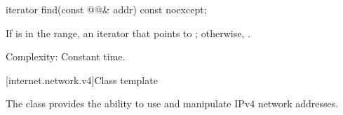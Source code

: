 \begin{itemdecl}
iterator find(const @@& addr) const noexcept;
\end{itemdecl}

\begin{itemdescr}
\pnum
\returns If  is in the range, an iterator that points to ; otherwise, .

\pnum
Complexity: Constant time.
\end{itemdescr}



%
[internet.network.v4]{Class template }

\pnum
The class  provides the ability to use and manipulate IPv4 network addresses.

